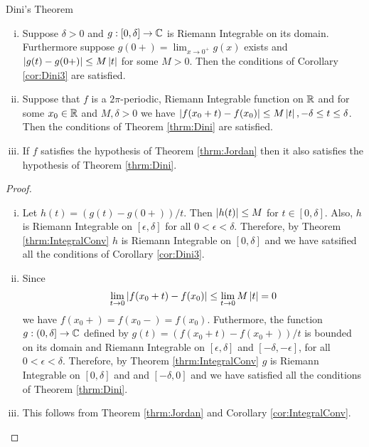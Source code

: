 \begin{section}{Dini's Theorem}
\begin{cor}
	\begin{enumerate}[i)]
		\item
			Suppose $\delta > 0$ and $g:[0,\delta] \to
			\mathbb{C}$ is Riemann Integrable on its domain.
			Furthermore suppose $g(0+) = \lim_{x \rightarrow
			0^+} g(x)$ exists and $\left \vert {g(t)-g(0+)} \right \vert \leq
			M \left \vert {t} \right \vert$ for some $M > 0$. Then the conditions
			of Corollary \ref{cor:Dini3} are satisfied.
		\item
			Suppose that $f$ is a $2\pi$-periodic, Riemann Integrable
			function on $\mathbb{R}$ and for some $x_0 \in \mathbb{R}$ and $M,
			\delta > 0$ we have $\left \vert {f(x_0+t)-f(x_0)} \right \vert \leq M
			\left \vert {t} \right \vert, -\delta \leq t \leq \delta$. Then the
			conditions of Theorem \ref{thrm:Dini} are satisfied.
		\item
			If $f$ satisfies the hypothesis of Theorem \ref{thrm:Jordan}
			then it also satisfies the hypothesis of Theorem
			\ref{thrm:Dini}.
	\end{enumerate}
\end{cor}

\begin{proof}
	\begin{enumerate}[i)]
		\item
			Let $h(t) = (g(t)-g(0+))/t$. Then $\left \vert {h(t)} \right \vert \leq
			M$ for $t \in [0,\delta]$. Also, $h$ is Riemann Integrable
			on $[\epsilon,\delta]$ for all $0 < \epsilon < \delta$.
			Therefore, by Theorem \ref{thrm:IntegralConv} $h$ is
			Riemann Integrable on $[0,\delta]$ and we have satsified
			all the conditions of Corollary \ref{cor:Dini3}.
		\item
			Since
				\begin{displaymath}
					\lim_{t \rightarrow 0} \left \vert {f(x_0+t)-f(x_0)} \right \vert
						\leq \lim_{t \rightarrow 0} M \left \vert {t} \right \vert
						= 0
				\end{displaymath}
			we have $f(x_0+) = f(x_0-) = f(x_0)$. Futhermore, the
			function $g:(0,\delta] \to \mathbb{C}$ defined by $g(t)
			= (f(x_0+t)-f(x_0+))/t$ is bounded on its domain and
			Riemann Integrable on $[\epsilon,\delta]$ and
			$[-\delta,-\epsilon]$, for all
			$0 < \epsilon < \delta$. Therefore, by Theorem
			\ref{thrm:IntegralConv} $g$ is Riemann Integrable
			on $[0,\delta]$ and and $[-\delta,0]$ and we have satisfied
			all the conditions of Theorem \ref{thrm:Dini}.
		\item
			This follows from Theorem \ref{thrm:Jordan} and Corollary
			\ref{cor:IntegralConv}.
	\end{enumerate}
\end{proof}

\end{section}
